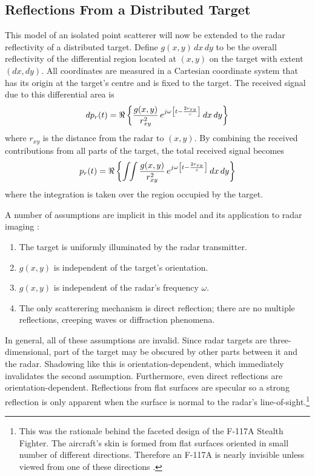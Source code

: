 \subsection{Reflections From a Distributed Target}


This model of an isolated point scatterer will now be extended to the radar
reflectivity of a distributed target. Define $g(x,y)\,dx\,dy$ to be
the overall reflectivity of the differential region located at $(x,y)$ on 
the target with extent $(dx,dy)$.  All coordinates are measured in a
Cartesian coordinate system that has its origin at the target's centre and is
fixed to the target.  The received signal due to this differential area is
\begin{equation}
dp_r(t)=\Re\left\{\frac{g(x,y)}{r_{xy}^2}\,
e^{j\omega\left[t-\frac{2r_{xy}}{c}\right]}\,dx\,dy\right\}
\end{equation}
where $r_{xy}$ is the distance from the radar to $(x,y)$.  By combining the
received contributions from all parts of the target, the total received
signal becomes
\begin{equation}\label{hrr eqn:pr(t)}
p_r(t)=\Re\left\{\int\!\!\int\frac{g(x,y)}{r_{xy}^2}\,
e^{j\omega\left[t-\frac{2r_{xy}}{c}\right]}\,dx\,dy\right\}
\end{equation}
where the integration is taken over the region occupied by the target.

A number of assumptions are implicit in this model and its application to
radar imaging \cite[ch. 9]{Rih69}:
\begin{enumerate}
\item The target is uniformly illuminated by the radar transmitter.
\item $g(x,y)$ is independent of the target's orientation.
\item $g(x,y)$ is independent of the radar's frequency $\omega$.
\item The only scatterering mechanism is direct reflection; there are no
multiple reflections, creeping waves or diffraction phenomena.
\end{enumerate}

In general, all of these assumptions are invalid.  Since radar targets are
three-dimensional, part of the target may be obscured by other parts between
it and the radar.  Shadowing like this is orientation-dependent, which
immediately invalidates the second assumption.  Furthermore, even direct
reflections are orientation-dependent. Reflections from flat surfaces are
specular so a strong reflection is only apparent when the surface is normal
to the radar's line-of-sight.\footnote{This was the rationale behind the
faceted design of the F-117A Stealth Fighter.  The aircraft's skin is formed
from flat surfaces oriented in small number of different directions. 
Therefore an F-117A is nearly invisible unless viewed from one of 
these directions \cite{Goo92}.}

